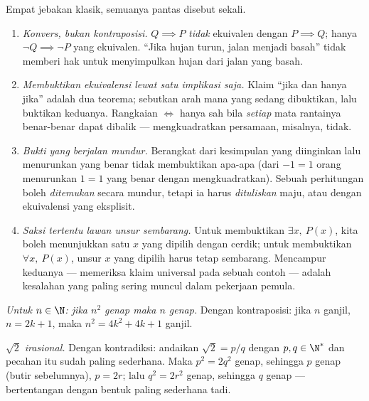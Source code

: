 \begin{remark}\label{rem:b1:logic:pitfalls}
Empat jebakan klasik, semuanya pantas disebut sekali.
\begin{enumerate}
  \item \emph{Konvers, bukan kontraposisi.} $Q \implies P$
        \emph{tidak} ekuivalen dengan $P \implies Q$; hanya $\lnot Q
        \implies \lnot P$ yang ekuivalen. ``Jika hujan turun, jalan
        menjadi basah'' tidak memberi hak untuk menyimpulkan hujan
        dari jalan yang basah.
  \item \emph{Membuktikan ekuivalensi lewat satu implikasi saja.}
        Klaim ``jika dan hanya jika'' adalah dua teorema; sebutkan
        arah mana yang sedang dibuktikan, lalu buktikan keduanya.
        Rangkaian $\iff$ hanya sah bila \emph{setiap} mata rantainya
        benar-benar dapat dibalik --- mengkuadratkan persamaan,
        misalnya, tidak.
  \item \emph{Bukti yang berjalan mundur.} Berangkat dari kesimpulan
        yang diinginkan lalu menurunkan  yang benar tidak
        membuktikan apa-apa (dari $-1 = 1$ orang menurunkan $1 = 1$
        yang benar dengan mengkuadratkan). Sebuah perhitungan boleh
        \emph{ditemukan} secara mundur, tetapi ia harus
        \emph{dituliskan} maju, atau dengan ekuivalensi yang eksplisit.
  \item \emph{Saksi tertentu lawan unsur sembarang.} Untuk membuktikan
        $\exists x,\ P(x)$, kita boleh menunjukkan satu $x$ yang
        dipilih dengan cerdik; untuk membuktikan $\forall x,\ P(x)$,
        unsur $x$ yang dipilih harus tetap sembarang. Mencampur
        keduanya --- memeriksa klaim universal pada sebuah contoh ---
        adalah kesalahan yang paling sering muncul dalam pekerjaan
        pemula.
\end{enumerate}
\end{remark}

\begin{example}\label{ex:b1:logic:sqrt2}
\emph{Untuk $n \in \N$: jika $n^2$ genap maka $n$ genap.} Dengan
kontraposisi: jika $n$ ganjil, $n = 2k+1$, maka
$n^2 = 4k^2 + 4k + 1$ ganjil.

\emph{$\sqrt 2$ irasional.} Dengan kontradiksi: andaikan
$\sqrt 2 = p/q$ dengan $p, q \in \N^*$ dan pecahan itu sudah paling
sederhana. Maka $p^2 = 2q^2$ genap, sehingga $p$ genap (butir
sebelumnya), $p = 2r$; lalu $q^2 = 2r^2$ genap, sehingga $q$ genap ---
bertentangan dengan bentuk paling sederhana tadi.
\end{example}

